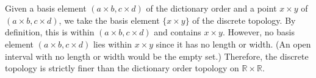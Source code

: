 \documentclass{article}
\begin{document}
\begin{enumerate}
\\\\Given a basis element $(a\times b, c\times d)$ of the dictionary order and a point $x \times y$ of $(a\times b, c\times d)$, we take the basis element $\{x \times y\}$ of the discrete topology. By definition, this is within $(a\times b, c\times d)$ and contains $x \times y$. However, no basis element $(a\times b, c\times d)$ lies within $x \times y$ since it has no length or width. (An open interval with no length or width would be the empty set.) Therefore, the discrete topology is strictly finer than the dictionary order topology on $\mathbb{R}\times\mathbb{R}$.

\end{enumerate}
\end{document}

